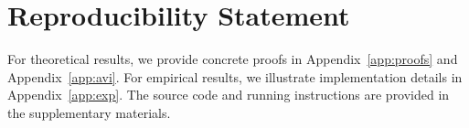 \section*{Reproducibility Statement}

For theoretical results, we provide concrete proofs in Appendix~\ref{app:proofs} and Appendix~\ref{app:avi}. For empirical results, we illustrate implementation details in Appendix~\ref{app:exp}. The source code and running instructions are provided in the supplementary materials.